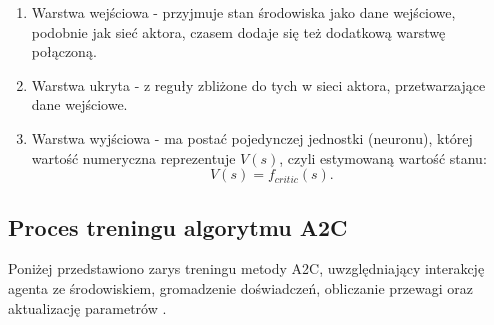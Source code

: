 \documentclass[a4paper, 12pt]{article}
\numberwithin{equation}{section}
\begin{document}
\begin{enumerate}
        \item Warstwa wejściowa - przyjmuje stan środowiska jako dane wejściowe, podobnie jak sieć aktora, czasem dodaje się też dodatkową warstwę połączoną.
        \item Warstwa ukryta - z reguły zbliżone do tych w sieci aktora, przetwarzające dane wejściowe.
        \item Warstwa wyjściowa - ma postać pojedynczej jednostki (neuronu), której wartość numeryczna reprezentuje \( V(s) \), czyli estymowaną wartość stanu:
        \begin{equation}
        V(s) = f_{critic}(s).
        \end{equation}    
    \end{enumerate}
    \subsection{Proces treningu algorytmu A2C}
    Poniżej przedstawiono zarys treningu metody A2C, uwzględniający interakcję agenta ze środowiskiem, gromadzenie doświadczeń, obliczanie przewagi oraz aktualizację parametrów \cite{lapan2020deep}. 
\end{document}
